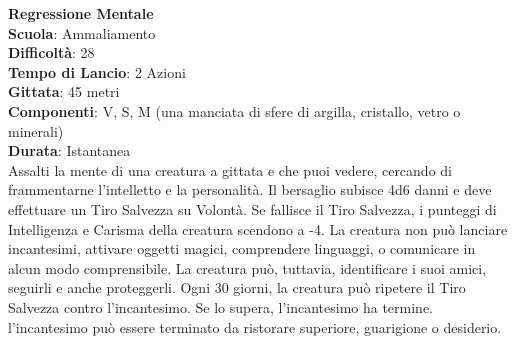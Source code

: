 \begin{multicols}{2}
\medskip\textbf{Regressione Mentale}\\
\textbf{Scuola}: Ammaliamento\\
\textbf{Difficoltà}:  28\\
\textbf{Tempo di Lancio}: 2 Azioni\\
\textbf{Gittata}: 45 metri\\
\textbf{Componenti}: V, S, M (una manciata di sfere di argilla, cristallo, vetro o minerali)\\
\textbf{Durata}: Istantanea\\
Assalti la mente di una creatura a gittata e che puoi vedere, cercando di frammentarne l’intelletto e la personalità. Il bersaglio subisce 4d6 danni e deve effettuare un Tiro Salvezza su Volontà. Se fallisce il Tiro Salvezza, i punteggi di Intelligenza e  Carisma della creatura scendono a -4. La creatura non può lanciare incantesimi, attivare oggetti magici, comprendere linguaggi, o comunicare in alcun modo comprensibile. La creatura può, tuttavia, identificare i suoi amici, seguirli e anche proteggerli. Ogni 30 giorni, la creatura può ripetere il Tiro Salvezza contro l'incantesimo. Se lo supera, l'incantesimo ha termine.\\ 
l'incantesimo può essere terminato da ristorare superiore, guarigione o desiderio.


\end{multicols}
